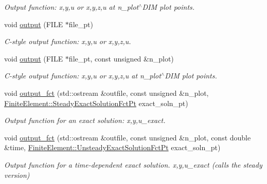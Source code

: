 \begin{DoxyCompactItemize}
\begin{DoxyCompactList}\small\item\em Output function\+: x,y,u or x,y,z,u at n\+\_\+plot$^\wedge$\+D\+IM plot points. \end{DoxyCompactList}\item 
void \hyperlink{classoomph_1_1TPoissonElement_a289c196b8a84337341e306887c82e3db}{output} (F\+I\+LE $\ast$file\+\_\+pt)
\begin{DoxyCompactList}\small\item\em C-\/style output function\+: x,y,u or x,y,z,u. \end{DoxyCompactList}\item 
void \hyperlink{classoomph_1_1TPoissonElement_a9abacba6348984ea82fa08bdf8ff2f9e}{output} (F\+I\+LE $\ast$file\+\_\+pt, const unsigned \&n\+\_\+plot)
\begin{DoxyCompactList}\small\item\em C-\/style output function\+: x,y,u or x,y,z,u at n\+\_\+plot$^\wedge$\+D\+IM plot points. \end{DoxyCompactList}\item 
void \hyperlink{classoomph_1_1TPoissonElement_a69344016c42eb40d39a0061175a6db94}{output\+\_\+fct} (std\+::ostream \&outfile, const unsigned \&n\+\_\+plot, \hyperlink{classoomph_1_1FiniteElement_a690fd33af26cc3e84f39bba6d5a85202}{Finite\+Element\+::\+Steady\+Exact\+Solution\+Fct\+Pt} exact\+\_\+soln\+\_\+pt)
\begin{DoxyCompactList}\small\item\em Output function for an exact solution\+: x,y,u\+\_\+exact. \end{DoxyCompactList}\item 
void \hyperlink{classoomph_1_1TPoissonElement_a06d4e2f4c6bf67caf316af96e85b61d8}{output\+\_\+fct} (std\+::ostream \&outfile, const unsigned \&n\+\_\+plot, const double \&time, \hyperlink{classoomph_1_1FiniteElement_ad4ecf2b61b158a4b4d351a60d23c633e}{Finite\+Element\+::\+Unsteady\+Exact\+Solution\+Fct\+Pt} exact\+\_\+soln\+\_\+pt)
\begin{DoxyCompactList}\small\item\em Output function for a time-\/dependent exact solution. x,y,u\+\_\+exact (calls the steady version) \end{DoxyCompactList}\end{DoxyCompactItemize}
